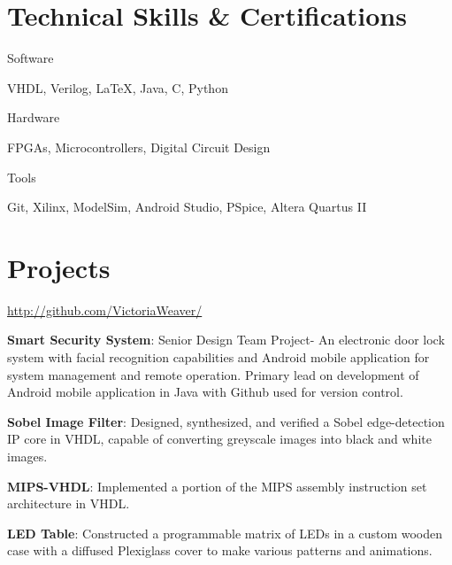 \documentclass[a4paper,margin,line]{resume}
\begin{document}
\begin{resume}
\section{\mysidestyle Technical Skills \& Certifications}
    \begin{compactdesc}
        \item[Software] \begin{inparaenum} { \small
            VHDL,
            Verilog,
            \LaTeX,
            Java,
            C,
            Python
        } \end{inparaenum}
        \item[Hardware] \begin{inparaenum} { \small
            FPGAs, Microcontrollers, Digital Circuit Design
       } \end{inparaenum}
        \item[Tools] \begin{inparaenum} { \small
            Git,
            Xilinx,
            ModelSim,
            Android Studio,
            PSpice,
            Altera Quartus II
        } \end{inparaenum}
    \end{compactdesc}

\section{\mysidestyle Projects}
    \begin{asparablank}
        \item \href{http://github.com/VictoriaWeaver/}{http://github.com/VictoriaWeaver/}\\
        \item \textbf{Smart Security System}: Senior Design Team Project- An electronic door lock system with facial recognition capabilities and Android mobile application for system management and remote operation.  Primary lead on development of Android mobile application in Java with Github used for version control.\\
        \item \textbf{Sobel Image Filter}: Designed, synthesized, and verified a Sobel edge-detection IP core in VHDL, capable of converting greyscale images into black and white images.\\
        \item \textbf{MIPS-VHDL}: Implemented a portion of the MIPS assembly instruction set architecture in VHDL.\\
        \item \textbf{LED Table}: Constructed a programmable matrix of LEDs in a custom wooden case with a diffused Plexiglass cover to make various patterns and animations.
    \end{asparablank}
    

\end{resume}
\end{document}
